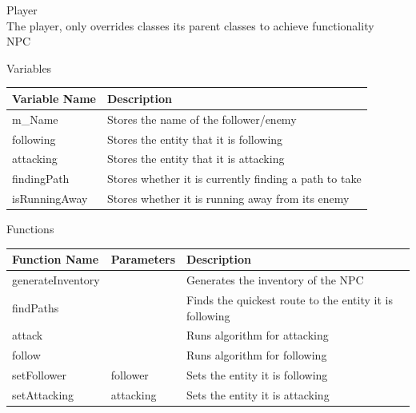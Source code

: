 \documentclass[../../Main.tex]{subfiles}
\begin{document}
    Player \\
    The player, only overrides classes its parent classes to achieve functionality \\
    NPC
    \begin{center}
        Variables
        \begin{tabular}{ | m{} | m{} | }
            \hline
            \textbf{Variable Name} & \textbf{Description} \\
            \hline
            m\_Name & Stores the name of the follower/enemy \\
            \hline
            following & Stores the entity that it is following \\
            \hline
            attacking & Stores the entity that it is attacking \\
            \hline
            findingPath & Stores whether it is currently finding a path to take \\
            \hline
            isRunningAway & Stores whether it is running away from its enemy \\
            \hline
        \end{tabular}
        Functions
        \begin{tabular}{ | m{} | m{}| m{} | }
            \hline
            \textbf{Function Name} & \textbf{Parameters} & \textbf{Description} \\
            \hline
            generateInventory & & Generates the inventory of the NPC \\
            \hline
            findPaths & & Finds the quickest route to the entity it is following \\
            \hline
            attack & & Runs algorithm for attacking \\
            \hline
            follow & & Runs algorithm for following \\
            \hline
            setFollower & follower & Sets the entity it is following \\
            \hline
            setAttacking & attacking & Sets the entity it is attacking \\
            \hline
        \end{tabular}
    \end{center}
\end{document}
